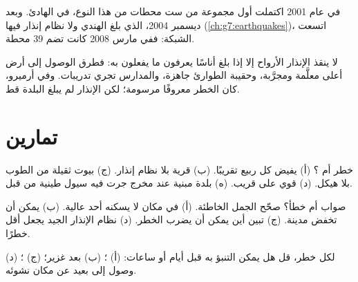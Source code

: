 \begin{history}
في عام 2001 اكتملت أول مجموعة من ست محطات من هذا النوع، في  الهادئ. وبعد
 ديسمبر 2004، الذي بلغ   الهندي ولا نظام إنذار
فيها (\cref{ch:g7:earthquakes})، اتسعت الشبكة: ففي مارس 2008 كانت تضم 39
محطة.
\end{history}

لا ينقذ الإنذار الأرواح إلا إذا بلغ أناسًا يعرفون ما يفعلون به: فطرق الوصول إلى أرض
أعلى معلَّمة ومجرَّبة، وحقيبة الطوارئ جاهزة، والمدارس تجري تدريبات. وفي أرميرو،
كان الخطر معروفًا  مرسومة؛ لكن الإنذار لم يبلغ البلدة
قط.

\section{تمارين}

\begin{exercise}[$\star$]\label{exo:g9:natural-risks:1}
خطر أم ؟ (أ)  يفيض كل ربيع تقريبًا. (ب) قرية بلا نظام إنذار. (ج) بيوت
ثقيلة من الطوب بلا هيكل. (د)  قوي على  قريب. (ه) بلدة مبنية عند مخرج
 جرت فيه سيول طينية من قبل.
\end{exercise}

\begin{exercise}[$\star$]\label{exo:g9:natural-risks:2}
صواب أم خطأ؟ صحّح الجمل الخاطئة. (أ)  في مكان لا يسكنه أحد 
عالية. (ب) يمكن  أن تخفض  مدينة. (ج) تبين  أين يمكن أن
يضرب الخطر. (د) نظام الإنذار الجيد يجعل  أقل
خطرًا.
\end{exercise}

\begin{exercise}[$\star$]\label{exo:g9:natural-risks:3}
لكل خطر، قل هل يمكن التنبؤ به قبل أيام أو ساعات: (أ) ؛ (ب)  بعد 
غزير؛ (ج) ؛ (د) وصول  إلى  بعيد عن مكان
نشوئه.
\end{exercise}


